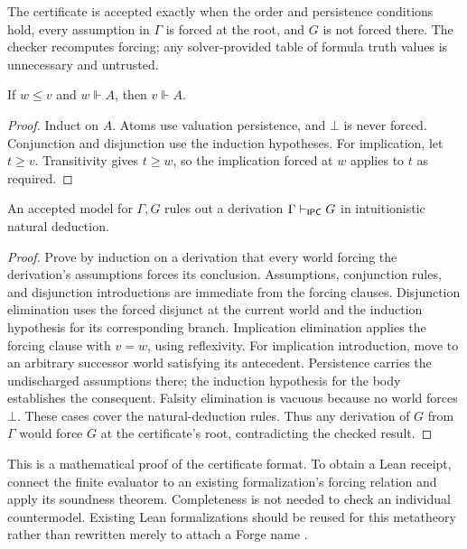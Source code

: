 The certificate is accepted exactly when the order and persistence conditions
hold, every assumption in $\Gamma$ is forced at the root, and $G$ is not forced
there. The checker recomputes forcing; any solver-provided table of formula
truth values is unnecessary and untrusted.

\begin{lemma}[Persistence]
If $w\le v$ and $w\Vdash A$, then $v\Vdash A$.
\end{lemma}
\begin{proof}
Induct on $A$. Atoms use valuation persistence, and $\bot$ is never forced.
Conjunction and disjunction use the induction hypotheses. For implication,
let $t\ge v$. Transitivity gives $t\ge w$, so the implication forced at $w$
applies to $t$ as required.
\end{proof}

\begin{theorem}\label{thm:kripke}
An accepted model for $\Gamma,G$ rules out a derivation
$\Gamma\vdash_{\mathsf{IPC}}G$ in intuitionistic natural deduction.
\end{theorem}
\begin{proof}
Prove by induction on a derivation that every world forcing the derivation's
assumptions forces its conclusion. Assumptions, conjunction rules, and
 disjunction introductions are immediate from the forcing clauses. Disjunction
elimination uses the forced disjunct at the current world and the induction
hypothesis for its corresponding branch. Implication elimination applies the
forcing clause with $v=w$, using reflexivity. For implication introduction,
move to an arbitrary successor world satisfying its antecedent. Persistence
carries the undischarged assumptions there; the induction hypothesis for the
body establishes the consequent. Falsity elimination is vacuous because no
world forces $\bot$. These cases cover the natural-deduction rules. Thus any
derivation of $G$ from $\Gamma$ would force $G$ at the certificate's root,
contradicting the checked result.
\end{proof}

This is a mathematical proof of the certificate format. To obtain a Lean
receipt, connect the finite evaluator to an existing formalization's forcing
relation and apply its soundness theorem. Completeness is not needed to check
an individual countermodel. Existing Lean formalizations should be reused for
this metatheory rather than rewritten merely to attach a Forge name
\cite{trufas}.

